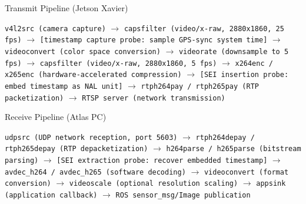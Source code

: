 \begin{algorithm}
\caption{Transmit Pipeline (Jetson Xavier)}
\begin{algorithmic}[1]
\State \texttt{v4l2src (camera capture)}
\State $\rightarrow$ \texttt{capsfilter (video/x-raw, 2880x1860, 25 fps)}
\State $\rightarrow$ \texttt{[timestamp capture probe: sample GPS-sync system time]}
\State $\rightarrow$ \texttt{videoconvert (color space conversion)}
\State $\rightarrow$ \texttt{videorate (downsample to 5 fps)}
\State $\rightarrow$ \texttt{capsfilter (video/x-raw, 2880x1860, 5 fps)}
\State $\rightarrow$ \texttt{x264enc / x265enc (hardware-accelerated compression)}
\State $\rightarrow$ \texttt{[SEI insertion probe: embed timestamp as NAL unit]}
\State $\rightarrow$ \texttt{rtph264pay / rtph265pay (RTP packetization)}
\State $\rightarrow$ \texttt{RTSP server (network transmission)}
\end{algorithmic} \label{vide_encode}
\end{algorithm}

\begin{algorithm}
\caption{Receive Pipeline (Atlas PC)}
\begin{algorithmic}[1]
\State \texttt{udpsrc (UDP network reception, port 5603)}
\State $\rightarrow$ \texttt{rtph264depay / rtph265depay (RTP depacketization)}
\State $\rightarrow$ \texttt{h264parse / h265parse (bitstream parsing)}
\State $\rightarrow$ \texttt{[SEI extraction probe: recover embedded timestamp]}
\State $\rightarrow$ \texttt{avdec\_h264 / avdec\_h265 (software decoding)}
\State $\rightarrow$ \texttt{videoconvert (format conversion)}
\State $\rightarrow$ \texttt{videoscale (optional resolution scaling)}
\State $\rightarrow$ \texttt{appsink (application callback)}
\State $\rightarrow$ \texttt{ROS sensor\_msg/Image publication}
\end{algorithmic} \label{video_decode}
\end{algorithm}

